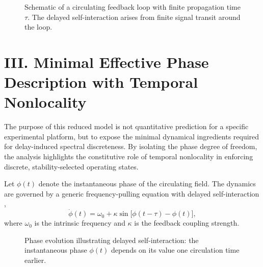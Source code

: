 \documentclass[11pt,a4paper]{article}
\begin{document}
\begin{figure}[h]
\centering
{}
\caption{Schematic of a circulating feedback loop with finite propagation time $\tau$. The delayed self-interaction arises from finite signal transit around the loop.}
\label{fig:circulation_loop}
\end{figure}

\section*{III. Minimal Effective Phase Description with Temporal Nonlocality}
The purpose of this reduced model is not quantitative prediction for a specific experimental platform, but to expose the minimal dynamical ingredients required for delay-induced spectral discreteness. By isolating the phase degree of freedom, the analysis highlights the constitutive role of temporal nonlocality in enforcing discrete, stability-selected operating states.

Let $\phi(t)$ denote the instantaneous phase of the circulating field. The dynamics are governed by a generic frequency-pulling equation with delayed self-interaction \cite{Yeung1999},
\begin{equation}
\dot{\phi}(t) = \omega_0 + \kappa \sin\big[\phi(t-\tau) - \phi(t)\big],
\end{equation}
where $\omega_0$ is the intrinsic frequency and $\kappa$ is the feedback coupling strength.

\begin{figure}[h]
\centering
{}
\caption{Phase evolution illustrating delayed self-interaction: the instantaneous phase $\phi(t)$ depends on its value one circulation time earlier.}
\label{fig:phase_feedback}
\end{figure}
\end{document}
